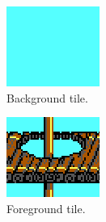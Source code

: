 \documentclass[book.tex]{subfiles}
\begin{document}
\begin{figure}[H]
\begin{subfigure}{.25\textwidth}
  \centering
  \includegraphics[width=.9\textwidth]{screenshots_300dpi/game/tile_composite_1.png}
  \caption{Background tile.}
\end{subfigure}%
\begin{subfigure}{.25\textwidth}
  \centering
  \includegraphics[width=.9\textwidth]{screenshots_300dpi/game/tile_composite_2.png}
  \caption{Foreground tile.}
\end{subfigure}
\begin{subfigure}{.25\textwidth}
  \centering

\end{subfigure}
\end{figure}
\end{document}
